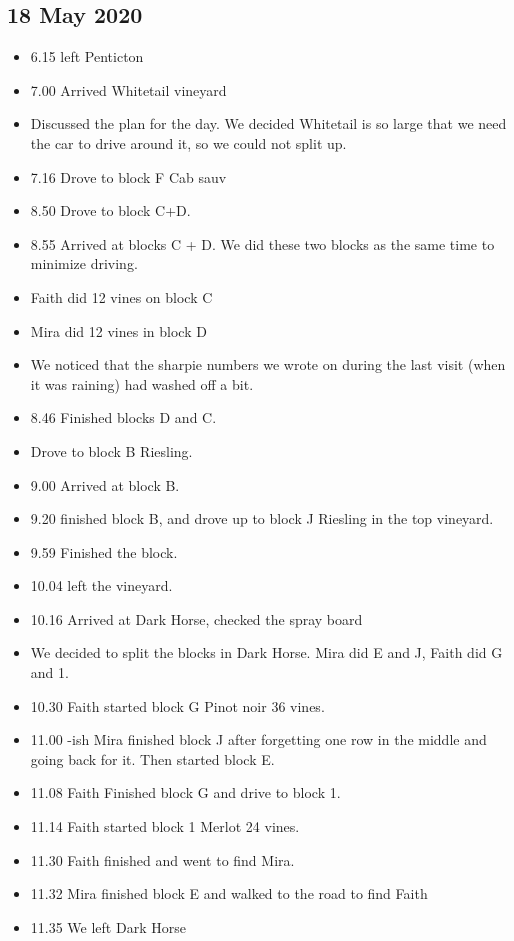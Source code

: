 \documentclass[11pt,letter]{article}
\newenvironment{smitemize}{
\begin{itemize}
  \setlength{\itemsep}{0pt}
  \setlength{\parskip}{0.8pt}
  \setlength{\parsep}{0pt}}
{\end{itemize}
}
\begin{document}
\subsection{18 May 2020}
\begin{smitemize}
\item 6.15 left Penticton 
\item 7.00 Arrived Whitetail vineyard
\item Discussed the plan for the day. We decided Whitetail is so large that we need the car to drive around it, so we could not split up. 
\item 7.16 Drove to block F Cab sauv
\item 8.50 Drove to block C+D. 
\item 8.55 Arrived at blocks C + D. We did these two blocks as the same time to minimize driving.  
\item Faith did 12 vines on block C
\item Mira did 12 vines in block D
\item We noticed that the sharpie numbers we wrote on during the last visit (when it was raining) had washed off a bit. 
\item 8.46 Finished blocks D and C.
\item Drove to block B Riesling.
\item 9.00 Arrived at block B.
\item 9.20 finished block B, and drove up to block J Riesling in the top vineyard.
\item 9.59 Finished the block. 
\item 10.04 left the vineyard.
\item 10.16 Arrived at Dark Horse, checked the spray board
\item We decided to split the blocks in Dark Horse. Mira did E and J, Faith did G and 1.
\item 10.30 Faith started block G Pinot noir 36 vines.
\item 11.00 -ish Mira finished block J after forgetting one row in the middle and going back for it. Then started block E.
\item 11.08 Faith Finished block G and drive to block 1.
\item 11.14 Faith started block 1 Merlot 24 vines.
\item 11.30 Faith finished and went to find Mira.
\item 11.32 Mira finished block E and walked to the road to find Faith
\item 11.35 We left Dark Horse

\end{smitemize}
\end{document}
